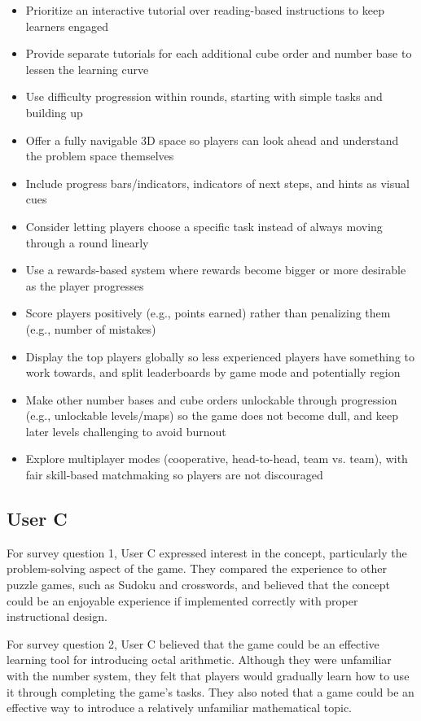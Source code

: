 \documentclass{article}
\begin{document}
\begin{itemize}
  \item Prioritize an interactive tutorial over reading-based instructions to keep learners engaged
  \item Provide separate tutorials for each additional cube order and number base to lessen the learning curve
  \item Use difficulty progression within rounds, starting with simple tasks and building up
  \item Offer a fully navigable 3D space so players can look ahead and understand the problem space themselves
  \item Include progress bars/indicators, indicators of next steps, and hints as visual cues
  \item Consider letting players choose a specific task instead of always moving through a round linearly
  \item Use a rewards-based system where rewards become bigger or more desirable as the player progresses
  \item Score players positively (e.g., points earned) rather than penalizing them (e.g., number of mistakes)
  \item Display the top players globally so less experienced players have something to work towards, and split leaderboards by game mode and potentially region
  \item Make other number bases and cube orders unlockable through progression (e.g., unlockable levels/maps) so the game does not become dull, and keep later levels challenging to avoid burnout
  \item Explore multiplayer modes (cooperative, head-to-head, team vs. team), with fair skill-based matchmaking so players are not discouraged
\end{itemize}

\subsection{User C}

For survey question 1, User C expressed interest in the concept, particularly
the problem-solving aspect of the game. They compared the experience to other
puzzle games, such as Sudoku and crosswords, and believed that the concept
could be an enjoyable experience if implemented correctly with proper instructional design.

For survey question 2, User C believed that the game could be an effective
learning tool for introducing octal arithmetic. Although they were unfamiliar
with the number system, they felt that players would gradually learn how to
use it through completing the game's tasks. They also noted that a game could
be an effective way to introduce a relatively unfamiliar mathematical topic.
\end{document}
